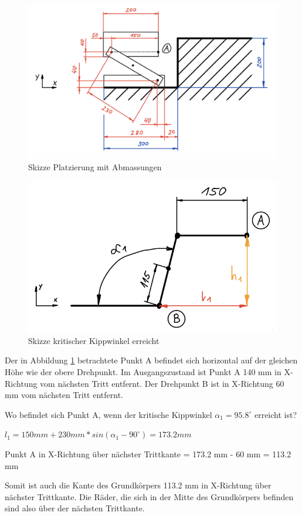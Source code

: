 \begin{figure}[H]
  \includegraphics[width=0.7
  \textwidth]{img/Treppensteigen/Skizze Platzierung}
  \centering
  \caption{Skizze Platzierung mit Abmassungen}
  \label{fig:skizze-platzierung}
\end{figure}

\begin{figure}[H]
  \includegraphics[width=0.6
  \textwidth]{img/Treppensteigen/Analyse 1.png}
  \centering
  \caption{Skizze kritischer Kippwinkel erreicht}
  \label{fig:kritischer-kippwinkel}
\end{figure}

Der in Abbildung \ref{fig:skizze-platzierung} betrachtete Punkt A befindet sich horizontal auf der gleichen Höhe wie der obere Drehpunkt. Im Ausgangszustand ist Punkt A 140 mm in X-Richtung vom nächsten Tritt entfernt. Der Drehpunkt B ist in X-Richtung 60 mm vom nächsten Tritt entfernt.

Wo befindet sich Punkt A, wenn der kritische Kippwinkel \(\alpha_{1} = 95.8^\circ\) erreicht ist?


\(l_{1} = 150 mm + 230 mm * sin(\alpha_{1} - 90^\circ) = 173.2 mm\)

Punkt A in X-Richtung über nächster Trittkante = 173.2 mm - 60 mm = 113.2 mm

Somit ist auch die Kante des Grundkörpers 113.2 mm in X-Richtung über nächster Trittkante.
Die Räder, die sich in der Mitte des Grundkörpers befinden sind also über der nächsten Trittkante.\\

